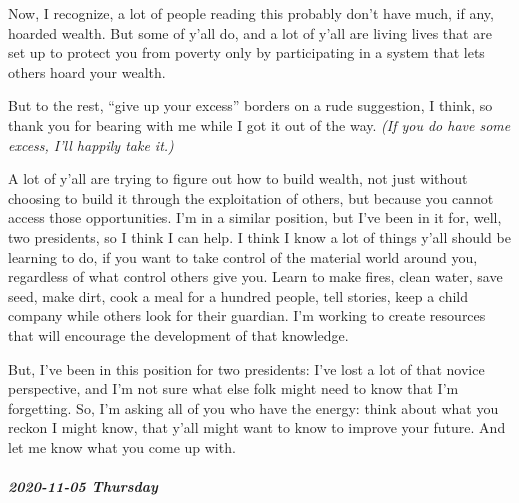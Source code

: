 \documentclass[11pt]{article}
\begin{document}
\begin{itemize}
Now, I recognize, a lot of people reading this probably don’t have much, if any, hoarded wealth. But some of y’all do, and a lot of y’all are living lives that are set up to protect you from poverty only by participating in a system that lets others hoard your wealth.

But to the rest, “give up your excess” borders on a rude suggestion, I think, so thank you for bearing with me while I got it out of the way. \emph{(If you do have some excess, I’ll happily take it.)}

A lot of y’all are trying to figure out how to build wealth, not just without choosing to build it through the exploitation of others, but because you cannot access those opportunities. I’m in a similar position, but I’ve been in it for, well, two presidents, so I think I can help. I think I know a lot of things y’all should be learning to do, if you want to take control of the material world around you, regardless of what control others give you. Learn to make fires, clean water, save seed, make dirt, cook a meal for a hundred people, tell stories, keep a child company while others look for their guardian. I’m working to create resources that will encourage the development of that knowledge.

But, I’ve been in this position for two presidents: I’ve lost a lot of that novice perspective, and I’m not sure what else folk might need to know that I’m forgetting. So, I’m asking all of you who have the energy: think about what you reckon I might know, that y’all might want to know to improve your future. And let me know what you come up with.
\end{itemize}
\subparagraph*{2020-11-05 Thursday}
\label{sec:org6ec31da}
\end{document}
